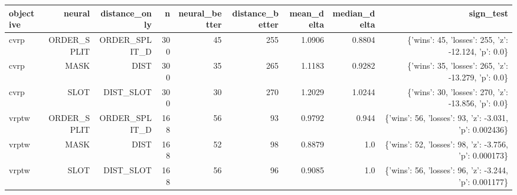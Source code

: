 \begin{tabular}{lrrrrrrrr}
\toprule
objective & neural & distance\_only & n & neural\_better & distance\_better & mean\_delta & median\_delta & sign\_test \\
\midrule
cvrp & ORDER\_SPLIT & ORDER\_SPLIT\_D & 300 & 45 & 255 & 1.0906 & 0.8804 & \{'wins': 45, 'losses': 255, 'z': -12.124, 'p': 0.0\} \\
cvrp & MASK & DIST & 300 & 35 & 265 & 1.1183 & 0.9282 & \{'wins': 35, 'losses': 265, 'z': -13.279, 'p': 0.0\} \\
cvrp & SLOT & DIST\_SLOT & 300 & 30 & 270 & 1.2029 & 1.0244 & \{'wins': 30, 'losses': 270, 'z': -13.856, 'p': 0.0\} \\
vrptw & ORDER\_SPLIT & ORDER\_SPLIT\_D & 168 & 56 & 93 & 0.9792 & 0.944 & \{'wins': 56, 'losses': 93, 'z': -3.031, 'p': 0.002436\} \\
vrptw & MASK & DIST & 168 & 52 & 98 & 0.8879 & 1.0 & \{'wins': 52, 'losses': 98, 'z': -3.756, 'p': 0.000173\} \\
vrptw & SLOT & DIST\_SLOT & 168 & 56 & 96 & 0.9085 & 1.0 & \{'wins': 56, 'losses': 96, 'z': -3.244, 'p': 0.001177\} \\
\bottomrule
\end{tabular}
